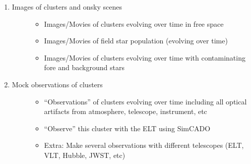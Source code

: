 \documentclass[letterpaper,10pt,english]{sphinxmanual}
\begin{document}
\begin{enumerate}
\begin{description}
\begin{itemize}
\end{itemize}

\end{description}

\item {} \begin{description}
\item[{Images of clusters and on\sphinxhyphen{}sky scenes}] \leavevmode\begin{itemize}
\item {} 
\sphinxAtStartPar
Images/Movies of clusters evolving over time in free space

\item {} 
\sphinxAtStartPar
Images/Movies of field star population (evolving over time)

\item {} 
\sphinxAtStartPar
Images/Movies of clusters evolving over time with contaminating fore\sphinxhyphen{} and
background stars

\end{itemize}

\end{description}

\item {} \begin{description}
\item[{Mock observations of clusters}] \leavevmode\begin{itemize}
\item {} 
\sphinxAtStartPar
“Observations” of clusters evolving over time including all optical
artifacts from atmosphere, telescope, instrument, etc

\item {} 
\sphinxAtStartPar
“Observe” this cluster with the ELT using SimCADO

\item {} 
\sphinxAtStartPar
Extra: Make several observations with different telescopes (ELT, VLT, Hubble, JWST, etc)

\end{itemize}

\end{description}

\end{enumerate}
\end{document}

